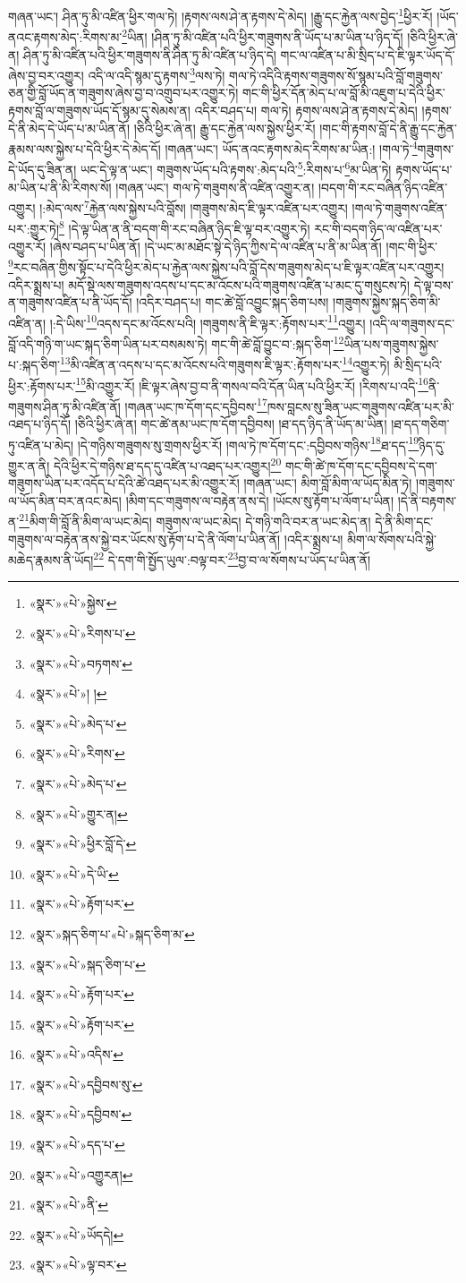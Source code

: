 གཞན་ཡང་། ཤིན་ཏུ་མི་འཛིན་ཕྱིར་གལ་ཏེ། །རྟགས་ལས་ཤེ་ན་རྟགས་དེ་མེད། །རྒྱུ་དང་རྐྱེན་ལས་བྱེད་\footnote{«སྣར་»«པེ་»སྐྱེས་}ཕྱིར་རོ། །ཡོད་ནའང་རྟགས་མེད་:རིགས་མ་\footnote{«སྣར་»«པེ་»རིགས་པ་}ཡིན། །ཤིན་ཏུ་མི་འཛིན་པའི་ཕྱིར་གཟུགས་ནི་ཡོད་པ་མ་ཡིན་པ་ཉིད་དོ། །ཅིའི་ཕྱིར་ཞེ་ན། ཤིན་ཏུ་མི་འཛིན་པའི་ཕྱིར་གཟུགས་ནི་ཤིན་ཏུ་མི་འཛིན་པ་ཉིད་དེ། གང་ལ་འཛིན་པ་མི་སྲིད་པ་དེ་ཇི་ལྟར་ཡོད་དོ་ཞེས་བྱ་བར་འགྱུར། འདི་ལ་འདི་སྙམ་དུ་རྟགས་\footnote{«སྣར་»«པེ་»བཏགས་}ལས་ཏེ། གལ་ཏེ་འདིའི་རྟགས་གཟུགས་སོ་སྙམ་པའི་བློ་གཟུགས་ཅན་གྱི་བློ་ཡོད་ན་གཟུགས་ཞེས་བྱ་བ་འགྲུབ་པར་འགྱུར་ཏེ། གང་གི་ཕྱིར་དོན་མེད་པ་ལ་བློ་མི་འཇུག་པ་དེའི་ཕྱིར་རྟགས་བློ་ལ་གཟུགས་ཡོད་དོ་སྙམ་དུ་སེམས་ན། འདིར་བཤད་པ། གལ་ཏེ། རྟགས་ལས་ཤེ་ན་རྟགས་དེ་མེད། །རྟགས་དེ་ནི་མེད་དེ་ཡོད་པ་མ་ཡིན་ནོ། །ཅིའི་ཕྱིར་ཞེ་ན། རྒྱུ་དང་རྐྱེན་ལས་སྐྱེས་ཕྱིར་རོ། །གང་གི་རྟགས་བློ་དེ་ནི་རྒྱུ་དང་རྐྱེན་རྣམས་ལས་སྐྱེས་པ་དེའི་ཕྱིར་དེ་མེད་དོ། །གཞན་ཡང་། ཡོད་ནའང་རྟགས་མེད་རིགས་མ་ཡིན:། །གལ་ཏེ་\footnote{«སྣར་»«པེ་»། །}གཟུགས་དེ་ཡོད་དུ་ཟིན་ན། ཡང་དེ་ལྟ་ན་ཡང་། གཟུགས་ཡོད་པའི་རྟགས་:མེད་པའི་\footnote{«སྣར་»«པེ་»མེད་པ་}:རིགས་པ་\footnote{«སྣར་»«པེ་»རིགས་}མ་ཡིན་ཏེ། རྟགས་ཡོད་པ་མ་ཡིན་པ་ནི་མི་རིགས་སོ། །གཞན་ཡང་། གལ་ཏེ་གཟུགས་ནི་འཛིན་འགྱུར་ན། །བདག་གི་རང་བཞིན་ཉིད་འཛིན་འགྱུར། །:མེད་ལས་\footnote{«སྣར་»«པེ་»མེད་པ་}རྐྱེན་ལས་སྐྱེས་པའི་བློས། །གཟུགས་མེད་ཇི་ལྟར་འཛིན་པར་འགྱུར། །གལ་ཏེ་གཟུགས་འཛིན་པར་:གྱུར་ཏེ།\footnote{«སྣར་»«པེ་»གྱུར་ན།} །དེ་ལྟ་ཡིན་ན་ནི་བདག་གི་རང་བཞིན་ཉིད་ཇི་ལྟ་བར་འགྱུར་ཏེ། རང་གི་བདག་ཉིད་ལ་འཛིན་པར་འགྱུར་རོ། །ཞེས་བཤད་པ་ཡིན་ནོ། །དེ་ཡང་མ་མཐོང་སྟེ་དེ་ཉིད་ཀྱིས་དེ་ལ་འཛིན་པ་ནི་མ་ཡིན་ནོ། །གང་གི་ཕྱིར་\footnote{«སྣར་»«པེ་»ཕྱིར་བློ་དེ་}རང་བཞིན་གྱིས་སྟོང་པ་དེའི་ཕྱིར་མེད་པ་རྐྱེན་ལས་སྐྱེས་པའི་བློ་དེས་གཟུགས་མེད་པ་ཇི་ལྟར་འཛིན་པར་འགྱུར། འདིར་སྨྲས་པ། མདོ་སྡེ་ལས་གཟུགས་འདས་པ་དང་མ་འོངས་པའི་གཟུགས་འཛིན་པ་མང་དུ་གསུངས་ཏེ། དེ་ལྟ་བས་ན་གཟུགས་འཛིན་པ་ནི་ཡོད་དོ། །འདིར་བཤད་པ། གང་ཚེ་བློ་འབྱུང་སྐད་ཅིག་པས། །གཟུགས་སྐྱེས་སྐད་ཅིག་མི་འཛིན་ན། །:དེ་ཡིས་\footnote{«སྣར་»«པེ་»དེ་ཡི་}འདས་དང་མ་འོངས་པའི། །གཟུགས་ནི་ཇི་ལྟར་:རྟོགས་པར་\footnote{«སྣར་»«པེ་»རྟོག་པར་}འགྱུར། །འདི་ལ་གཟུགས་དང་བློ་འདི་གཉི་ག་ཡང་སྐད་ཅིག་ཡིན་པར་བསམས་ཏེ། གང་གི་ཚེ་བློ་བྱུང་བ་:སྐད་ཅིག་\footnote{«སྣར་»སྐད་ཅིག་པ་«པེ་»སྐད་ཅིག་མ་}ཡིན་པས་གཟུགས་སྐྱེས་པ་:སྐད་ཅིག་\footnote{«སྣར་»«པེ་»སྐད་ཅིག་པ་}མི་འཛིན་ན་འདས་པ་དང་མ་འོངས་པའི་གཟུགས་ཇི་ལྟར་:རྟོགས་པར་\footnote{«སྣར་»«པེ་»རྟོག་པར་}འགྱུར་ཏེ། མི་སྲིད་པའི་ཕྱིར་:རྟོགས་པར་\footnote{«སྣར་»«པེ་»རྟོག་པར་}མི་འགྱུར་རོ། །ཇི་ལྟར་ཞེས་བྱ་བ་ནི་གསལ་བའི་དོན་ཡིན་པའི་ཕྱིར་རོ། །རིགས་པ་འདི་\footnote{«སྣར་»«པེ་»འདིས་}ནི་གཟུགས་ཤིན་ཏུ་མི་འཛིན་ནོ། །གཞན་ཡང་ཁ་དོག་དང་དབྱིབས་\footnote{«སྣར་»«པེ་»དབྱིབས་སུ་}ཁས་བླངས་སུ་ཟིན་ཡང་གཟུགས་འཛིན་པར་མི་འཐད་པ་ཉིད་དོ། །ཅིའི་ཕྱིར་ཞེ་ན། གང་ཚེ་ནམ་ཡང་ཁ་དོག་དབྱིབས། །ཐ་དད་ཉིད་ནི་ཡོད་མ་ཡིན། །ཐ་དད་གཅིག་ཏུ་འཛིན་པ་མེད། །དེ་གཉིས་གཟུགས་སུ་གྲགས་ཕྱིར་རོ། །གལ་ཏེ་ཁ་དོག་དང་:དབྱིབས་གཉིས་\footnote{«སྣར་»«པེ་»དབྱིབས་}ཐ་དད་\footnote{«སྣར་»«པེ་»དད་པ་}ཉིད་དུ་གྱུར་ན་ནི། དེའི་ཕྱིར་དེ་གཉིས་ཐ་དད་དུ་འཛིན་པ་འཐད་པར་འགྱུར།\footnote{«སྣར་»«པེ་»འགྱུརན།} གང་གི་ཚེ་ཁ་དོག་དང་དབྱིབས་དེ་དག་གཟུགས་ཡིན་པར་འདོད་པ་དེའི་ཚེ་འཐད་པར་མི་འགྱུར་རོ། །གཞན་ཡང་། མིག་བློ་མིག་ལ་ཡོད་མིན་ཏེ། །གཟུགས་ལ་ཡོད་མིན་བར་ནའང་མེད། །མིག་དང་གཟུགས་ལ་བརྟེན་ནས་དེ། །ཡོངས་སུ་རྟོག་པ་ལོག་པ་ཡིན། །དེ་ནི་བརྟགས་ན་\footnote{«སྣར་»«པེ་»ནི་}མིག་གི་བློ་ནི་མིག་ལ་ཡང་མེད། གཟུགས་ལ་ཡང་མེད། དེ་གཉི་གའི་བར་ན་ཡང་མེད་ན། དེ་ནི་མིག་དང་གཟུགས་ལ་བརྟེན་ནས་སྐྱེ་བར་ཡོངས་སུ་རྟོག་པ་དེ་ནི་ལོག་པ་ཡིན་ནོ། །འདིར་སྨྲས་པ། མིག་ལ་སོགས་པའི་སྐྱེ་མཆེད་རྣམས་ནི་ཡོད།\footnote{«སྣར་»«པེ་»ཡོདདེ།} དེ་དག་གི་སྤྱོད་ཡུལ་:བལྟ་བར་\footnote{«སྣར་»«པེ་»ལྟ་བར་}བྱ་བ་ལ་སོགས་པ་ཡོད་པ་ཡིན་ནོ། 